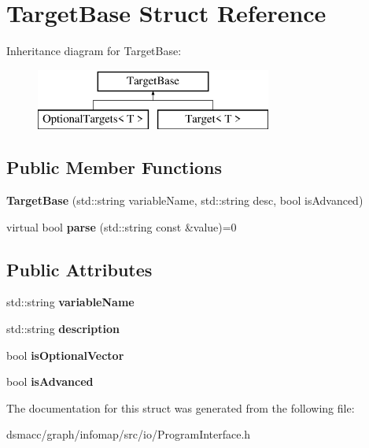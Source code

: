 \hypertarget{structTargetBase}{}\section{Target\+Base Struct Reference}
\label{structTargetBase}
Inheritance diagram for Target\+Base\+:\begin{figure}[H]
\begin{center}
\leavevmode
\includegraphics[height=2.000000cm]{structTargetBase}
\end{center}
\end{figure}
\subsection*{Public Member Functions}
\begin{DoxyCompactItemize}
\item 
\mbox{\label{structTargetBase_a82b8a7a8ee9294be114b46b72521e39e}} 
{\bfseries Target\+Base} (std\+::string variable\+Name, std\+::string desc, bool is\+Advanced)
\item 
\mbox{\label{structTargetBase_afbf819ea353c87d1625109df03822356}} 
virtual bool {\bfseries parse} (std\+::string const \&value)=0
\end{DoxyCompactItemize}
\subsection*{Public Attributes}
\begin{DoxyCompactItemize}
\item 
\mbox{\label{structTargetBase_a689b85a867bdb567d93cc003c05f6f57}} 
std\+::string {\bfseries variable\+Name}
\item 
\mbox{\label{structTargetBase_a08259e643233bc621270428313c7d783}} 
std\+::string {\bfseries description}
\item 
\mbox{\label{structTargetBase_a0f5d64b03923c150388366dfac0afaea}} 
bool {\bfseries is\+Optional\+Vector}
\item 
\mbox{\label{structTargetBase_a34d541796489360c571952f2c8e26a3d}} 
bool {\bfseries is\+Advanced}
\end{DoxyCompactItemize}


The documentation for this struct was generated from the following file\+:\begin{DoxyCompactItemize}
\item 
dsmacc/graph/infomap/src/io/Program\+Interface.\+h\end{DoxyCompactItemize}
